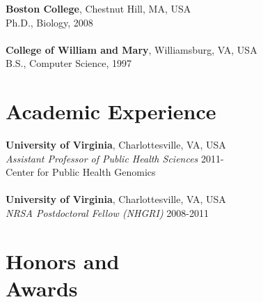 \documentclass[margin,line]{cv}
\begin{document}
\begin{resume}
    \textbf{Boston College}, Chestnut Hill, MA, USA\\
    Ph.D., Biology, 2008\\
    \\
    \textbf{College of William and Mary}, Williamsburg, VA, USA\\
    B.S., Computer Science, 1997


    \section{\mysidestyle Academic Experience}

    \textbf{University of Virginia}, Charlottesville, VA, USA\\
    \textit{Assistant Professor of Public Health Sciences}                              \hfill 2011-\\
    Center for Public Health Genomics\\
    \\
    \textbf{University of Virginia}, Charlottesville, VA, USA\\
    \textit{NRSA Postdoctoral Fellow (NHGRI)}                                          \hfill 2008-2011\\


    \section{\mysidestyle Honors and\\Awards} 


\end{resume}
\end{document}
